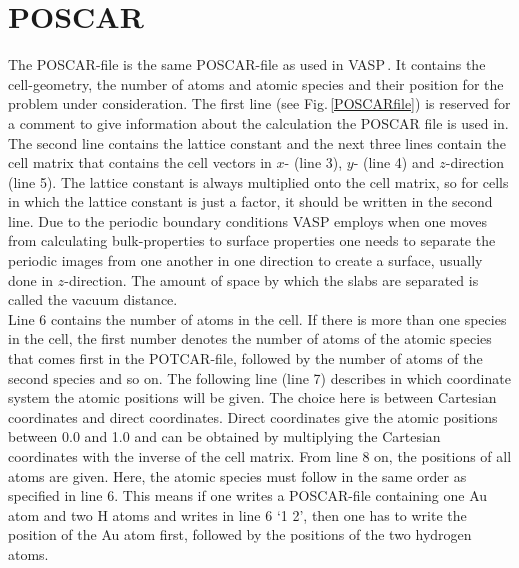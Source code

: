 \documentclass[twoside, 11pt, titlepage, captions=nooneline, a4paper, headsepline]{scrbook}%
\begin{document}
\section{POSCAR}
\label{Sec:VASP:POSCAR}
The \textsc{POSCAR}-file is the same POSCAR-file as used in VASP\,\cite{vasp1,vasp2,vasp3,vasp4,vasp_manual,vasp_online}. It contains the cell-geometry, the number of atoms and atomic species and their position for the problem under consideration. The first line (see Fig.\,\ref{POSCARfile}) is reserved for a comment to give information about the calculation the POSCAR file is used in. The second line contains the lattice constant and the next three lines contain the cell matrix that contains the cell vectors in $x$- (line 3), $y$- (line 4) and $z$-direction (line 5). The lattice constant is always multiplied onto the cell matrix, so for cells in which the lattice constant is just a factor, it should be written in the second line. Due to the periodic boundary conditions VASP employs when one moves from calculating bulk-properties to surface properties one needs to separate the periodic images from one another in one direction to create a surface, usually done in $z$-direction. The amount of space by which the slabs are separated is called the vacuum distance.\\
Line 6 contains the number of atoms in the cell. If there is more than one species in the cell, the first number denotes the number of atoms of the atomic species that comes first in the POTCAR-file, followed by the number of atoms of the second species and so on. The following line (line 7) describes in which coordinate system the atomic positions will be given. The choice here is between Cartesian coordinates and direct coordinates. Direct coordinates give the atomic positions between 0.0 and 1.0 and can be obtained by multiplying the Cartesian coordinates with the inverse of the cell matrix. From line 8 on, the positions of all atoms are given. Here, the atomic species must follow in the same order as specified in line 6. This means if one writes a POSCAR-file containing one Au atom and two H atoms and writes in line 6 `1 2', then one has to write the position of the Au atom first, followed by the positions of the two hydrogen atoms.
\end{document}
